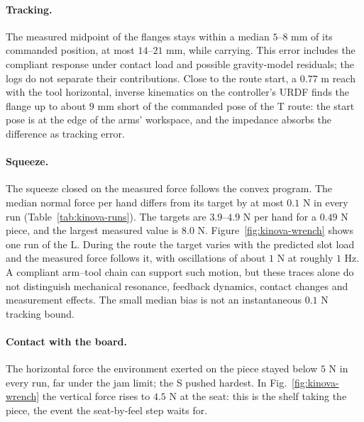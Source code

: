 \paragraph{Tracking.} The measured midpoint of the flanges stays within a median $5$--$8$ mm of its commanded position, at most $14$--$21$ mm, while carrying. This error includes the compliant response under contact load and possible gravity-model residuals; the logs do not separate their contributions. Close to the route start, a $0.77$ m reach with the tool horizontal, inverse kinematics on the controller's URDF finds the flange up to about $9$ mm short of the commanded pose of the T route: the start pose is at the edge of the arms' workspace, and the impedance absorbs the difference as tracking error.

\paragraph{Squeeze.} The squeeze closed on the measured force follows the convex program. The median normal force per hand differs from its target by at most $0.1$ N in every run (Table~\ref{tab:kinova-runs}). The targets are $3.9$--$4.9$ N per hand for a $0.49$ N piece, and the largest measured value is $8.0$ N. Figure~\ref{fig:kinova-wrench} shows one run of the L. During the route the target varies with the predicted slot load and the measured force follows it, with oscillations of about $1$ N at roughly $1$ Hz. A compliant arm--tool chain can support such motion, but these traces alone do not distinguish mechanical resonance, feedback dynamics, contact changes and measurement effects. The small median bias is not an instantaneous $0.1$ N tracking bound.


\paragraph{Contact with the board.} The horizontal force the environment exerted on the piece stayed below $5$ N in every run, far under the jam limit; the S pushed hardest. In Fig.~\ref{fig:kinova-wrench} the vertical force rises to $4.5$ N at the seat: this is the shelf taking the piece, the event the seat-by-feel step waits for.

